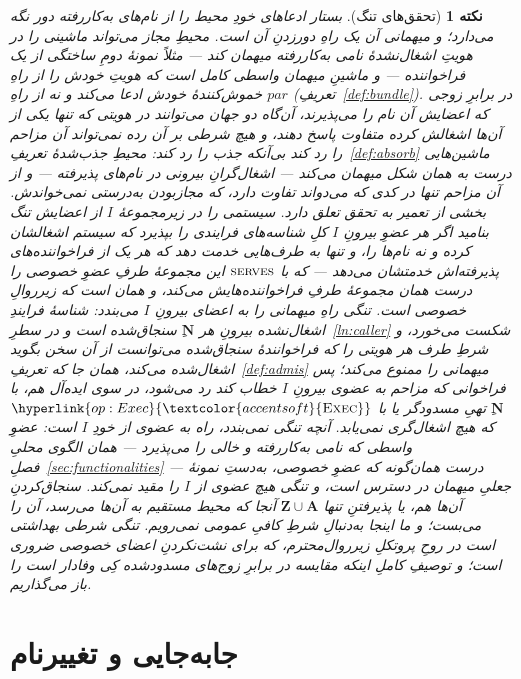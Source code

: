 \documentclass[10pt,oneside,openany]{book}
\newcommand{\admits}{\mathbf{N}}
\newcommand{\Apid}{\mathbf{A}}
\newcommand{\Zpid}{\mathbf{Z}}
\newcommand{\pars}{\mathit{par}}
\newcommand{\serves}{\op{serves}}
\newcommand{\op}[1]{\textnormal{\textsc{#1}}}
\newcommand{\opl}[1]{\hyperlink{op:#1}{\textcolor{accentsoft}{\op{#1}}}}
\theoremstyle{accentdef}
\newtheorem{remark}[definition]{نکته}
\theoremstyle{accentplain}
\begin{document}
\begin{remark}[تحقق‌های تنگ]\label{rem:tight}
بستار ادعاهای خودِ محیط را از نام‌های به‌کاررفته دور نگه می‌دارد؛ و میهمانی
آن یک راهِ دور‌زدنِ آن است. محیطِ مجاز می‌تواند ماشینی را در هویتِ
\emph{اشغال‌نشده}ٔ نامی به‌کاررفته میهمان کند --- مثلاً نمونهٔ دومِ ساختگی از
یک فراخواننده --- و ماشینِ میهمان واسطی کامل است که هویتِ خودش را از راهِ
خموش‌کنندهٔ خودش ادعا می‌کند و نه از راهِ $\pars$
(تعریفِ~\ref{def:bundle}). در برابرِ زوجی که اعضایش آن نام را می‌پذیرند،
آن‌گاه دو جهان می‌توانند در هویتی که تنها یکی از آن‌ها اشغالش کرده متفاوت
پاسخ دهند، و هیچ شرطی بر آن رده نمی‌تواند آن مزاحم را رد کند بی‌آنکه جذب را
رد کند: محیطِ جذب‌شدهٔ تعریفِ~\ref{def:absorb} ماشین‌هایی درست به همان شکل
میهمان می‌کند --- اشغال‌گرانِ بیرونی در نام‌های پذیرفته --- و از آن مزاحم
تنها در کدی که می‌دواند تفاوت دارد، که مجازبودن به‌درستی نمی‌خواندش. بخشی
از تعمیر به تحقق تعلق دارد. سیستمی را در زیرمجموعهٔ $I$ از اعضایش
\emph{تنگ} بنامید اگر هر عضوِ بیرونِ $I$ کلِ شناسه‌های فرایندی را بپذیرد که
سیستم اشغالشان کرده و نه نام‌ها را، و تنها به طرف‌هایی خدمت دهد که هر یک از
فراخواننده‌های پذیرفته‌اش خدمتشان می‌دهد --- که با $\serves$ این مجموعهٔ
طرفِ عضوِ خصوصی را درست همان مجموعهٔ طرفِ فراخواننده‌هایش می‌کند، و همان است
که زیرروالِ خصوصی است. تنگی راهِ میهمانی را \emph{به اعضای بیرونِ $I$}
می‌بندد: شناسهٔ فرایندِ اشغال‌نشده بیرونِ هر $\admits$ِ سنجاق‌شده است و در
سطرِ~\ref{ln:caller} شکست می‌خورد، و شرطِ طرف هر هویتی را که فراخوانندهٔ
سنجاق‌شده می‌توانست از آن سخن بگوید اشغال‌شده می‌کند، همان جا که
تعریفِ~\ref{def:admis} میهمانی را ممنوع می‌کند؛ پس فراخوانی که مزاحم به
عضوی بیرونِ $I$ خطاب کند رد می‌شود، در سوی ایده‌آل هم، با $\admits$ِ تهیِ
مسدودگر یا با $\opl{Exec}$ که هیچ اشغال‌گری نمی‌یابد. آنچه تنگی
\emph{نمی‌بندد}، راه به عضوی از خودِ $I$ است: عضوِ واسطی که نامی
به‌کاررفته و خالی را می‌پذیرد --- همان الگوی محلیِ
فصلِ~\ref{sec:functionalities} --- درست همان‌گونه که عضوِ خصوصی، به‌دستِ
نمونهٔ جعلیِ میهمان در دسترس است، و تنگی هیچ عضوی از $I$ را مقید نمی‌کند.
سنجاق‌کردنِ آن‌ها هم، یا پذیرفتنِ تنها $\Zpid \cup \Apid$ آنجا که محیط
مستقیم به آن‌ها می‌رسد، آن را می‌بست؛ و ما اینجا به‌دنبالِ شرطِ کافیِ
عمومی نمی‌رویم. تنگی شرطی بهداشتی است در روحِ پروتکلِ زیرروال‌محترم، که
برای نشت‌نکردنِ اعضای خصوصی ضروری است؛ و توصیفِ کاملِ اینکه مقایسه در برابرِ
زوج‌های مسدودشده کِی وفادار است را باز می‌گذاریم.
\end{remark}


\chapter{جابه‌جایی و تغییرنام}\label{sec:reloc}
\end{document}
